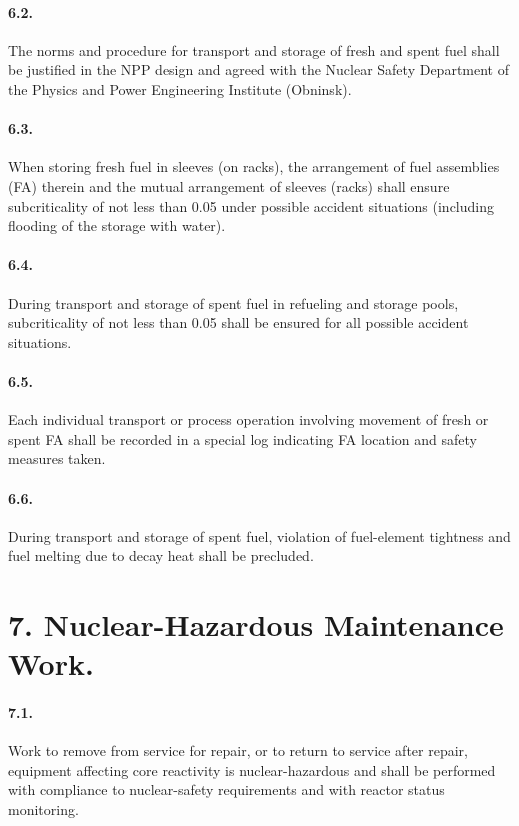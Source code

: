 \documentclass[openright]{bookest}
\begin{document}
\paragraph{6.2.} The norms and procedure for transport and storage of fresh and spent fuel shall be justified in the NPP design and agreed with the Nuclear Safety Department of the Physics and Power Engineering Institute (Obninsk).

\paragraph{6.3.} When storing fresh fuel in sleeves (on racks), the arrangement of fuel assemblies (FA) therein and the mutual arrangement of sleeves (racks) shall ensure subcriticality of not less than \num{0.05} under possible accident situations (including flooding of the storage with water).

\paragraph{6.4.} During transport and storage of spent fuel in refueling and storage pools, subcriticality of not less than \num{0.05} shall be ensured for all possible accident situations.

\paragraph{6.5.} Each individual transport or process operation involving movement of fresh or spent FA shall be recorded in a special log indicating FA location and safety measures taken.

\paragraph{6.6.} During transport and storage of spent fuel, violation of fuel-element tightness and fuel melting due to decay heat shall be precluded.

\section*{7. Nuclear-Hazardous Maintenance Work.}

\paragraph{7.1.} Work to remove from service for repair, or to return to service after repair, equipment affecting core reactivity is nuclear-hazardous and shall be performed with compliance to nuclear-safety requirements and with reactor status monitoring.
\end{document}
